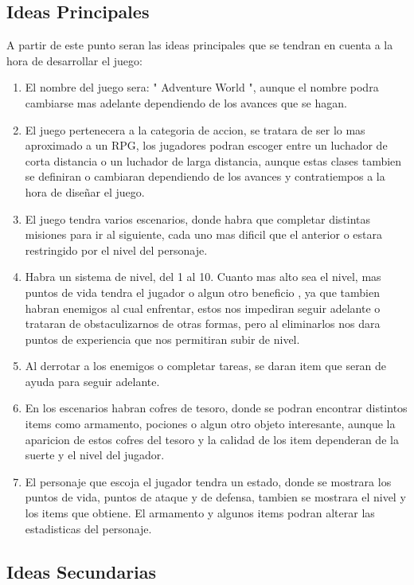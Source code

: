 \documentclass{article}
\begin{document}
\subsection{Ideas Principales}
A partir de este punto seran las ideas principales que se tendran en cuenta a la hora de desarrollar el juego:

\begin{enumerate}
    \item El nombre del juego sera: " Adventure World ", aunque el nombre podra cambiarse mas adelante dependiendo de los avances que se hagan.
    \item El juego pertenecera a la categoria de accion, se tratara de ser lo mas aproximado a un RPG, los jugadores podran escoger entre un luchador de corta distancia o un luchador de larga distancia, aunque estas clases tambien se definiran o cambiaran dependiendo de los avances y contratiempos a la hora de diseñar el juego.
    \item El juego tendra varios escenarios, donde habra que completar distintas misiones para ir al siguiente, cada uno mas dificil que el anterior o estara restringido por el nivel del personaje.
    \item Habra un sistema de nivel, del 1 al 10. Cuanto mas alto sea el nivel, mas puntos de vida tendra el jugador o algun otro beneficio , ya que tambien habran enemigos al cual enfrentar, estos nos impediran seguir adelante o trataran de obstaculizarnos de otras formas, pero al eliminarlos nos dara puntos de experiencia que nos permitiran subir de nivel.
    \item Al derrotar a los enemigos o completar tareas, se daran item que seran de ayuda para seguir adelante.
    \item En los escenarios habran cofres de tesoro, donde se podran encontrar distintos items como armamento, pociones o algun otro objeto interesante, aunque la aparicion de estos cofres del tesoro y la calidad de los item dependeran de la suerte y el nivel del jugador.
    \item El personaje que escoja el jugador tendra un estado, donde se mostrara los puntos de vida, puntos de ataque y de defensa, tambien se mostrara el nivel y los items que obtiene. El armamento y algunos items podran alterar las estadisticas del personaje.
\end{enumerate}
\subsection{Ideas Secundarias}
\end{document}
